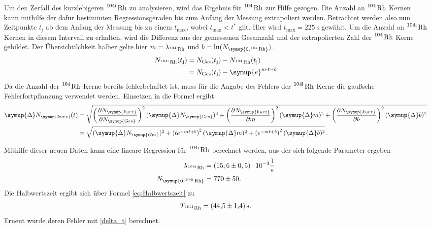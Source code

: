 Um den Zerfall des kurzlebigeren $\ce{^{104\text{i}} Rh}$ zu analysieren, wird das Ergebnis für $\ce{^104 Rh}$
zur Hilfe gezogen.
Die Anzahl an $\ce{^104 Rh}$ Kernen kann mithilfe der dafür bestimmten Regressionsgeraden bis zum Anfang
der Messung extrapoliert werden. Betrachtet werden also nun Zeitpunkte $t_{\text{j}}$ ab dem Anfang der
Messung bis zu einem $t_{\text{max}}$, wobei $t_{\text{max}}<t^*$ gilt.
Hier wird $t_{\text{max}}=\qty{225}{\second}$ gewählt.
Um die Anzahl an $\ce{^{104\text{i}} Rh}$ Kernen in diesem Intervall zu erhalten, wird die Differenz
aus der gemessenen Gesamzahl und der extrapolierten Zahl der $\ce{^104 Rh}$ Kerne gebildet.
Der Übersichtilchkeit halber gelte hier $m=\lambda_{\ce{^104 Rh}}$ und $b=\ln(N_{\symup{0, \ce{^104 Rh}}})$.
\begin{align*}
  N_{\ce{^{104\text{i}} Rh}}(t_{\text{j}}) &= N_{\text{Ges}}(t_{\text{j}}) - N_{\ce{^104 Rh}}(t_{\text{j}}) \\
  &= N_{\text{Ges}}(t_{\text{j}}) - \symup{e}^{m \cdot t + b}
\end{align*}
Da die Anzahl der $\ce{^104 Rh}$ Kerne bereits fehlerbehaftet ist, muss für die Angabe des Fehlers der
$\ce{^{104\text{i}} Rh}$ Kerne die gaußsche Fehlerfortpflanzung verwendet werden.
Einsetzen in die Formel ergibt
\begin{align*}
  \symup{\Delta} N_{\symup{kurz}}(t) &= \sqrt{
    \left(\frac{\partial N_{\symup{kurz}}}{\partial N_{\symup{Ges}}}\right)^2 (\symup{\Delta} N_{\symup{Ges}})^2 +
    \left(\frac{\partial N_{\symup{kurz}}}{\partial m}\right)^2 (\symup{\Delta} m)^2 + 
    \left(\frac{\partial N_{\symup{kurz}}}{\partial b}\right)^2 (\symup{\Delta} b)^2} \\
  &= \sqrt{
    (\symup{\Delta} N_{\symup{Ges}})^2 +
    \left(te^{-mt+b}\right)^2 (\symup{\Delta} m)^2 +
    \left(e^{-mt+b}\right)^2 (\symup{\Delta} b)^2
    }\,. \\
\end{align*}

Mithilfe dieser neuen Daten kann eine lineare Regression für $\ce{^{104\text{i}} Rh}$ berechnet werden,
aus der sich folgende Parameter ergeben
\begin{align*}
  \lambda_{\ce{^{104\text{i}} Rh}} &= (15,6 \pm 0,5) \cdot 10^{-3} \unit{\per\second} \\
  N_{\symup{0, \ce{^{104\text{i}} Rh}}} &= 770 \pm 50.
\end{align*}
Die Halbwertszeit ergibt sich über Formel \eqref{eq:Halbwertszeit} zu
\begin{gather*}
  T_{\ce{^{104\text{i}} Rh}} = \qty{44.5+-1.4}{\second}.
\end{gather*}
Erneut wurde deren Fehler mit \eqref{delta_t} berechnet.

